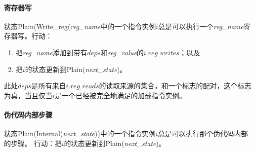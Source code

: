 \paragraph{寄存器写}\label{omm:reg_write}
状态{\sc Plain}({\sc Write\_reg}({\it reg\_name}中的一个指令实例$i$总是可以执行一个{\it reg\_name}寄存器写。行动：
\begin{enumerate}
\item 把{\it reg\_name}添加到带有$deps$和{\it reg\_value}的$i.\textit{reg\_writes}$；以及  %
\item 把$i$的状态更新到{\sc Plain}({\it next\_state})。 %
\end{enumerate}
此处$deps$是所有来自$i.\textit{reg\_reads}$的读取来源的集合，和一个标志的配对，这个标志为真，当且仅当$i$是一个已经被完全地满足的加载指令实例。


\paragraph{伪代码内部步骤}\label{omm:sail_interp}
状态{\sc Plain}({\sc Internal}({\it next\_state}))中的一个指令实例$i$总是可以执行那个伪代码内部的步骤。
行动：把$i$的状态更新到{\sc Plain}({\it next\_state})。


